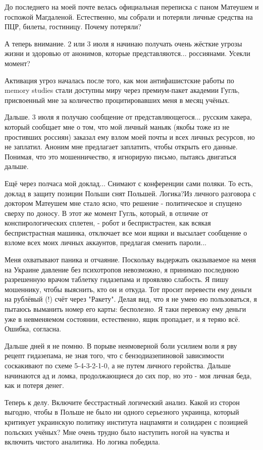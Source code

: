 До последнего на моей почте велась официальная переписка с паном Матеушем и
госпожой Магдаленой. Естественно, мы собрали и потеряли личные средства на ПЦР,
билеты, гостиницу. Почему потеряли?

А теперь внимание. 2 или 3 июля я начинаю получать очень жёсткие угрозы жизни и
здоровью от анонимов, которые представляются... россиянами. Усекли момент? 

Активация угроз началась после того, как мои антифашистские работы по memory
studies стали доступны миру через премиум-пакет академии Гугль, присвоенный мне
за количество процитировавших меня в месяц учёных. 

Дальше. 3 июля я получаю сообщение от представляющегося... русским хакера,
который сообщает мне о том, что мой личный маньяк (якобы тоже из не простивших
россиян) заказал ему взлом моей почты и всех личных ресурсов, но не заплатил.
Аноним мне предлагает заплатить, чтобы открыть его данные. Понимая, что это
мошенничество, я игнорирую письмо, пытаясь двигаться дальше.

Ещё через полчаса мой доклад... Снимают с конференции сами поляки. То есть,
доклад в защиту позиции Польши снят Польшей. Логика?Из личного разговора с
доктором Матеушем мне стало ясно, что решение - политическое и спущено сверху
по доносу. В этот же момент Гугль, который, в отличие от конспирологических
сплетен, - робот и беспристрастен, как всякая беспристрастная машинка,
отключает все мои ящики и высылает сообщение о взломе всех моих личных
аккаунтов, предлагая сменить пароли...

Меня охватывают паника и отчаяние. Поскольку выдержать оказываемое на меня на
Украине давление без психотропов невозможно, я принимаю последнюю разрешенную
врачом таблетку гидазепама и проявляю слабость. Я пишу мошеннику, чтобы
выяснить, кто он и откуда. Тот просит перевести ему деньги на рублёвый (!) счёт
через "Ракету". Делая вид, что я не умею ею пользоваться, я пытаюсь выманить
номер его карты: бесполезно. Я таки перевожу ему деньги уже в невменяемом
состоянии, естественно, ящик пропадает, и я теряю всё. Ошибка, согласна.

Дальше дней я не помню. В порыве неимоверной боли усилием воли я рву рецепт
гидазепама, не зная того, что с бензодиазепиновой зависимости соскакивают по
схеме 5-4-3-2-1-0, а не путем личного геройства. Дальше начинаются ад и ломка,
продолжающиеся до сих пор, но это - моя личная беда, как и потеря денег.

Теперь к делу. Включите бесстрастный логический анализ. Какой из сторон
выгодно, чтобы в Польше не было ни одного серьезного украинца, который
критикует украинскую политику института нацпамяти и солидарен с позицией
польских учёных? Мне очень трудно было наступить ногой на чувства и включить
чистого аналитика. Но логика победила.

